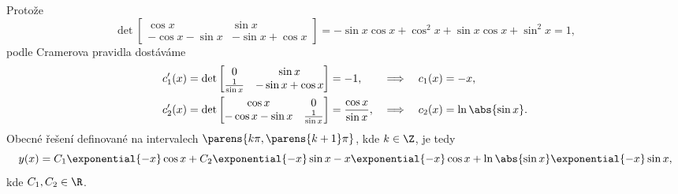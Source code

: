 \documentclass[answers]{exam}
\begin{document}
\begin{questions}
\begin{solution}
  	Protože
  	\begin{equation*}
  		\det 
  		\begin{bmatrix}
	  		\cos x & \sin x
	  		\\
	  		- \cos x - \sin x & - \sin x + \cos x
  		\end{bmatrix}
  		=
  		- \sin x \cos x + \cos^2 x + \sin x \cos x + \sin^2 x = 1,
  	\end{equation*}
  	podle Cramerova pravidla dostáváme
  	\begin{align*}
  		c_1'(x)
  		&=
  		\det
  		\begin{bmatrix}
	  		0 & \sin x
	  		\\
	  		\frac{1}{\sin x} & - \sin x + \cos x
  		\end{bmatrix}
  		=
  		- 1,
  		&
  		\implies
  		&&
  		c_1(x)
  		&=
  		-x,
  		\\
  		c_2'(x)
  		&=
  		\det
  		\begin{bmatrix}
	  		\cos x & 0
	  		\\
	  		- \cos x - \sin x & \frac{1}{\sin x}
  		\end{bmatrix} 
  		=
  		\frac{\cos x}{\sin x},
  		&
  		\implies
  		&&
  		c_2(x)
  		&=
  		\ln \abs{\sin x}.
  	\end{align*}
  	Obecné řešení definované na intervalech $\parens{k \pi, \parens{k + 1} \pi}$, kde $k \in \Z$, je tedy
  	\begin{equation*}
  		y(x) = C_1 \exponential{-x} \cos x + C_2 \exponential{-x} \sin x - x \exponential{-x} \cos x + \ln \abs{\sin x} \exponential{-x} \sin x,
  	\end{equation*}
  	kde $C_1, C_2 \in \R$.
  \end{solution}
   
\end{questions}
\end{document}
